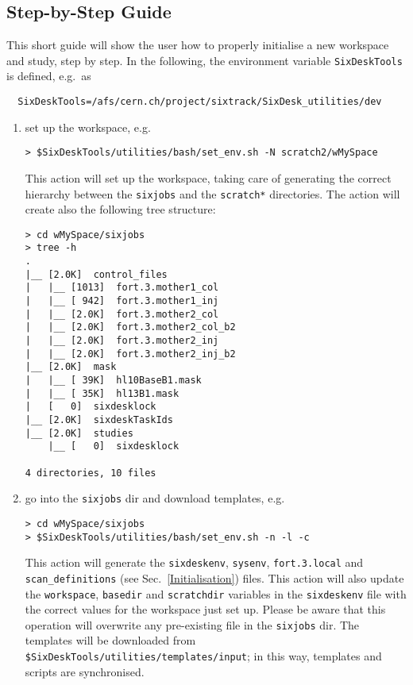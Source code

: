 \subsection{Step-by-Step Guide}
This short guide will show the user how to properly initialise
a new workspace and study, step by step. In the following,
the environment variable \texttt{SixDeskTools} is defined, e.g.~as
\begin{lstlisting}
  SixDeskTools=/afs/cern.ch/project/sixtrack/SixDesk_utilities/dev
\end{lstlisting}
\begin{enumerate}
\item set up the workspace, e.g.
\begin{lstlisting}
> $SixDeskTools/utilities/bash/set_env.sh -N scratch2/wMySpace
\end{lstlisting}
This action will set up the workspace, taking care of generating
the correct hierarchy between the \texttt{sixjobs} and the \texttt{scratch*}
directories. The action will create also the following tree structure:
\begin{lstlisting}
> cd wMySpace/sixjobs
> tree -h
.
|__ [2.0K]  control_files
|   |__ [1013]  fort.3.mother1_col
|   |__ [ 942]  fort.3.mother1_inj
|   |__ [2.0K]  fort.3.mother2_col
|   |__ [2.0K]  fort.3.mother2_col_b2
|   |__ [2.0K]  fort.3.mother2_inj
|   |__ [2.0K]  fort.3.mother2_inj_b2
|__ [2.0K]  mask
|   |__ [ 39K]  hl10BaseB1.mask
|   |__ [ 35K]  hl13B1.mask
|   [   0]  sixdesklock
|__ [2.0K]  sixdeskTaskIds
|__ [2.0K]  studies
    |__ [   0]  sixdesklock

4 directories, 10 files
\end{lstlisting}
\item go into the \texttt{sixjobs} dir and download templates, e.g.
\begin{lstlisting}
> cd wMySpace/sixjobs
> $SixDeskTools/utilities/bash/set_env.sh -n -l -c
\end{lstlisting}
This action will generate the \texttt{sixdeskenv}, \texttt{sysenv},
\texttt{fort.3.local} and \texttt{scan\_definitions} (see
Sec.~\ref{Initialisation}) files. This action will also update
the \texttt{workspace}, \texttt{basedir} and \texttt{scratchdir}
variables in the \texttt{sixdeskenv} file
with the correct values for the workspace just set up.
Please be aware that this operation will overwrite any
pre-existing file in the \texttt{sixjobs} dir. The templates
will be downloaded from
\texttt{\${SixDeskTools}/utilities/templates/input};
in this way, templates and scripts are synchronised.
\end{enumerate}

